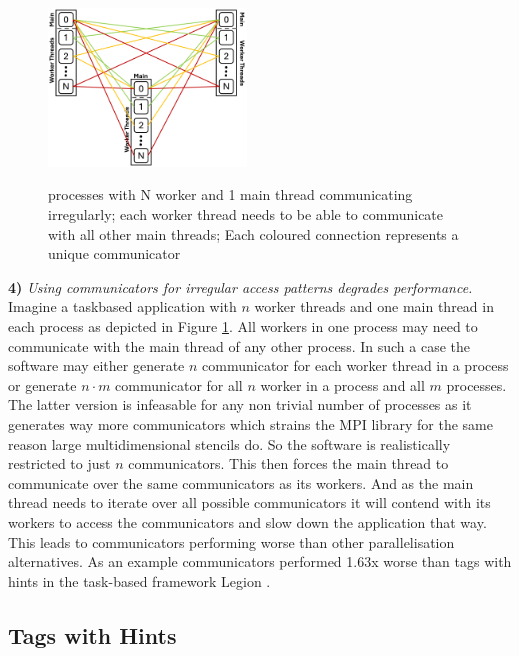 \documentclass[sigconf]{acmart}
\begin{document}
\begin{figure}
    \caption{processes with N worker and 1 main thread communicating irregularly; each worker thread needs to be able to communicate with all other main threads; Each coloured connection represents a unique communicator}
    \includegraphics[width=0.47\textwidth]{Communicator_Irregular.png}
    \label{fig:Communicator_Irregular}
\end{figure}

\textbf{4)} \textit{Using communicators for irregular access patterns degrades performance.}
Imagine a taskbased application with $n$ worker threads and one main thread in each process as depicted in Figure \ref{fig:Communicator_Irregular}.
All workers in one process may need to communicate with the main thread of any other process.
In such a case the software may either generate $n$ communicator for each worker thread in a process or generate $n \cdot m$ communicator for all $n$ worker in a process and all $m$ processes.
The latter version is infeasable for any non trivial number of processes as it generates way more communicators which strains the MPI library for the same reason large multidimensional stencils do.
So the software is realistically restricted to just $n$ communicators.
This then forces the main thread to communicate over the same communicators as its workers.
And as the main thread needs to iterate over all possible communicators it will contend with its workers to access the communicators and slow down the application that way.
This leads to communicators performing worse than other parallelisation alternatives.
As an example communicators performed 1.63x worse than tags with hints in the task-based framework Legion \cite{zambreLogicalParallel2021}.

\subsection{Tags with Hints}
\end{document}
